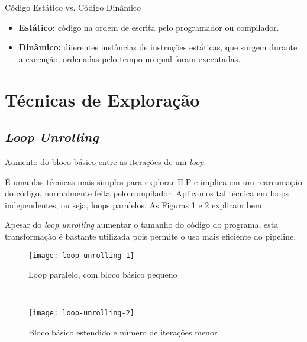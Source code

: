 \begin{definicao}{Código Estático vs. Código Dinâmico}
  \begin{itemize}
    \item \textbf{Estático:} código na ordem de escrita pelo programador ou compilador.

    \item \textbf{Dinâmico:} diferentes instâncias de instruções estáticas, que surgem durante a execução, ordenadas pelo tempo no qual foram executadas.
  \end{itemize}
\end{definicao}







\section{Técnicas de Exploração}

\subsection{\textit{Loop Unrolling}}
\begin{definicao}{}
  Aumento do bloco básico entre as iterações de um \textit{loop}.
\end{definicao}

É uma das técnicas mais simples para explorar ILP e implica em um rearrumação do código, normalmente feita pelo compilador. Aplicamos tal técnica em loops independentes, ou seja, loops paralelos. As Figuras \ref{fig:loop-unrolling-1} e \ref{fig:loop-unrolling-2} explicam bem.

Apesar do \textit{loop unrolling} aumentar o tamanho do código do programa, esta transformação é bastante utilizada pois permite o uso mais eficiente do pipeline.

\begin{figure*}
  \begin{subfigure}[b]{.45\textwidth}
    \centering
    \texttt{[image: loop-unrolling-1]}
    \caption{Loop paralelo, com bloco básico pequeno}
    \label{fig:loop-unrolling-1}
  \end{subfigure}
  ~
  \begin{subfigure}[b]{.45\textwidth}
    \centering
    \texttt{[image: loop-unrolling-2]}
    \caption{Bloco básico estendido e número de iterações menor}
    \label{fig:loop-unrolling-2}
  \end{subfigure}

  \caption{Exemplo de \textit{loop unrolling}}
\end{figure*}


